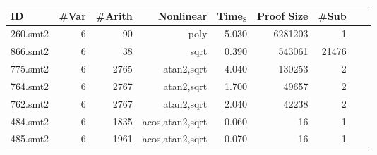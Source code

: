 \begin{table*}[t!h!]
  \begin{center}
\begin{tabular}{|l||r|r|r||r|r|r|r|r|}
\hline
ID & \#Var & \#Arith & Nonlinear & Time$_{\text{S}}$ & Proof Size & \#Sub \\
\hline
\hline
260.smt2 & 6 & 90 &  poly & 5.030 & 6281203 & 1 \\
\hline
866.smt2 & 6 & 38 & sqrt & 0.390 & 543061 & 21476 \\
\hline
775.smt2 & 6 & 2765 & atan2,sqrt & 4.040 & 130253 & 2 \\
\hline
764.smt2 & 6 & 2767 & atan2,sqrt & 1.700 & 49657 & 2 \\
\hline
762.smt2 & 6 & 2767 & atan2,sqrt & 2.040 & 42238 & 2 \\
\hline
484.smt2 & 6 & 1835 & acos,atan2,sqrt & 0.060 & 16 & 1 \\
\hline
485.smt2 & 6 & 1961 & acos,atan2,sqrt & 0.070 & 16 & 1 \\

\end{tabular}
\end{center}
\end{table*}
